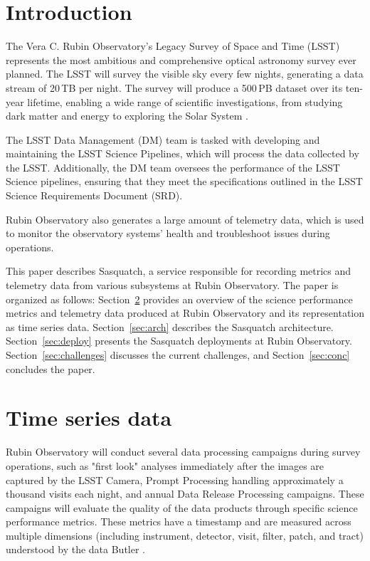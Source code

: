 
\section{Introduction}

The Vera C. Rubin Observatory's Legacy Survey of Space and Time (LSST) represents the most ambitious and comprehensive optical astronomy survey ever planned. The LSST will survey the visible sky every few nights, generating a data stream of 20\,TB per night. The survey will produce a 500\,PB dataset over its ten-year lifetime, enabling a wide range of scientific investigations, from studying dark matter and energy to exploring the Solar System \cite{2019ApJ...873..111I}.

The LSST Data Management (DM) team is tasked with developing and maintaining the LSST Science Pipelines, which will process the data collected by the LSST. Additionally, the DM team oversees the performance of the LSST Science pipelines, ensuring that they meet the specifications outlined in the LSST Science Requirements Document (SRD). \cite{LPM-17}

Rubin Observatory also generates a large amount of telemetry data, which is used to monitor the observatory systems' health and troubleshoot issues during operations.

This paper describes Sasquatch, a service responsible for recording metrics and telemetry data from various subsystems at Rubin Observatory. The paper is organized as follows: Section~\ref{sec:tsd} provides an overview of the science performance metrics and telemetry data produced at Rubin Observatory and its representation as time series data. Section~\ref{sec:arch} describes the Sasquatch architecture. Section~\ref{sec:deploy} presents the Sasquatch deployments at Rubin Observatory. Section~\ref{sec:challenges} discusses the current challenges, and Section~\ref{sec:conc} concludes the paper.

\section{Time series data}
\label{sec:tsd}

Rubin Observatory will conduct several data processing campaigns during survey operations, such as "first look" analyses immediately after the images are captured by the LSST Camera, Prompt Processing handling approximately a thousand visits each night, and annual Data Release Processing campaigns. \cite{LSE-163} These campaigns will evaluate the quality of the data products through specific science performance metrics. \cite{2019ASPC..523..521B,2022SPIE12189E..0MG} These metrics have a timestamp and are measured across multiple dimensions (including instrument, detector, visit, filter, patch, and tract) understood by the data Butler \cite{2019ASPC..523..521B,2022SPIE12189E..0MG,2022SPIE12189E..11J}.

